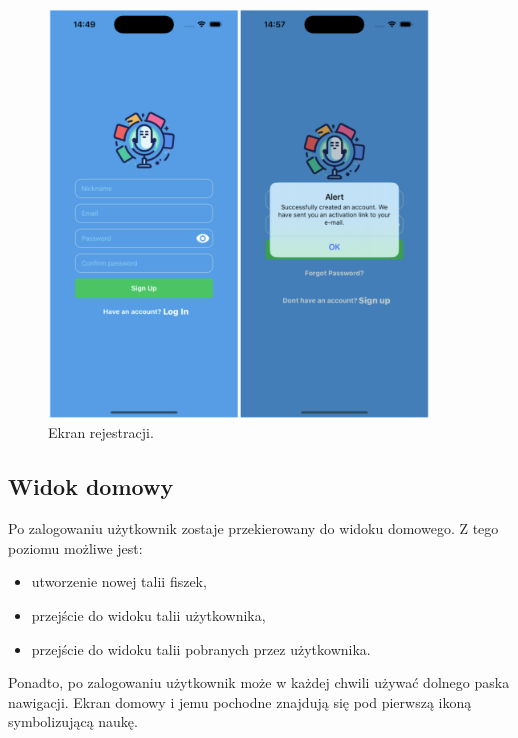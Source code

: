 \begin{figure}[H]
    \centering
    \includegraphics[width=0.9\textwidth]{chapters/chapter_10/images_mobile/mobile_register}
    \caption{Ekran rejestracji.}
    \label{img:mobile_register}
\end{figure}


\subsection{Widok domowy}
Po zalogowaniu użytkownik zostaje przekierowany do widoku domowego. Z tego poziomu możliwe jest:
\begin{itemize}
    \item utworzenie nowej talii fiszek,
    \item przejście do widoku talii użytkownika,
    \item przejście do widoku talii pobranych przez użytkownika.
\end{itemize}


Ponadto, po zalogowaniu użytkownik może w każdej chwili używać dolnego paska nawigacji. Ekran domowy i jemu pochodne znajdują się pod pierwszą ikoną symbolizującą naukę.


